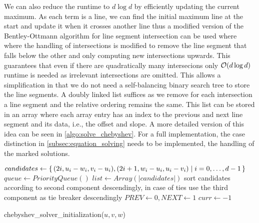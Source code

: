 We can also reduce the runtime to \(d \log d\) by efficiently updating the current maximum. As each term is a line, we can find the initial maximum line at the start and update it when it crosses another line thus a modified version of the Bentley-Ottmann algorithm for line segment intersection can be used where where the handling of intersections is modified to remove the line segment that falls below the other and only computing new intersections upwards. This guarantees that even if there are quadratically many intersecions only \(\mathcal{O}(d \log d)\) runtime is needed as irrelevant intersections are omitted. 
This allows a simplification in that we do not need a self-balancing binary search tree to store the line segments. A doubly linked list suffices as we remove for each intersection a line segment and the relative ordering remains the same. This list can be stored in an array where each array entry has an index to the previous and next line segment and its data, i.e., the offset and slope. A more detailed version of this idea can be seen in \cref{algo:solve_chebyshev}. For a full implementation, the case distinction in \cref{subsec:equation_solving} needs to be implemented, the handling of the marked solutions.

\begin{algorithm}[ht]
  \DontPrintSemicolon
  \BlankLine
  \(candidates \gets \set{(2i, u_i - w_i, v_i - u_i), (2i+1, w_i - u_i, u_i - v_i) | i = 0, \dots, d - 1}\) \;
  \(queue \gets PriorityQueue()\) \;
  \(list \gets Array(|candidates|)\) \;
  sort candidates according to second component descendingly,
  in case of ties use the third component as tie breaker descendingly \;
  \(PREV \gets 0, NEXT \gets 1\) 
  \(curr \gets -1\) \;

  \caption{chebyshev\_solver\_initialization(\(u, v, w\))}
  \label{algo:solve_chebyshev_init}
\end{algorithm}

